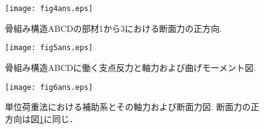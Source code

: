 \documentclass[10pt,a4j]{jarticle}
\begin{document}
\begin{figure}[h]
	\begin{center}
	\texttt{[image: fig4ans.eps]} 
	\end{center}
	\caption{骨組み構造ABCDの部材1から3における断面力の正方向.}
	\label{fig:fig4}
\end{figure}
\begin{figure}[h]
	\begin{center}
	\texttt{[image: fig5ans.eps]} 
	\end{center}
	\caption{骨組み構造ABCDに働く支点反力と軸力および曲げモーメント図.}
	\label{fig:fig5}
\end{figure}
\begin{figure}[h]
	\begin{center}
	\texttt{[image: fig6ans.eps]} 
	\end{center}
	\caption{
	単位荷重法における補助系とその軸力および断面力図.
	断面力の正方向は図\ref{fig:fig4}に同じ．}
	\label{fig:fig6}
\end{figure}
\end{document}

